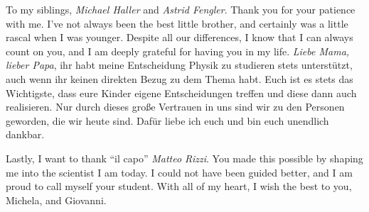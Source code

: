 To my siblings, {\it Michael Haller} and {\it Astrid Fengler}.
Thank you for your patience with me.
I've not always been the best little brother, and certainly was a little rascal when I was younger.
Despite all our differences, I know that I can always count on you, and I am deeply grateful for having you in my life.
{\it Liebe Mama, lieber Papa}, ihr habt meine Entscheidung Physik zu studieren stets unterstützt, auch wenn ihr keinen direkten Bezug zu dem Thema habt.
Euch ist es stets das Wichtigste, dass eure Kinder eigene Entscheidungen treffen und diese dann auch realisieren.
Nur durch dieses große Vertrauen in uns sind wir zu den Personen geworden, die wir heute sind.
Dafür liebe ich euch und bin euch unendlich dankbar.

Lastly, I want to thank ``il capo'' {\it Matteo Rizzi}.
You made this possible by shaping me into the scientist I am today.
I could not have been guided better, and I am proud to call myself your student.
With all of my heart, I wish the best to you, Michela, and Giovanni.
